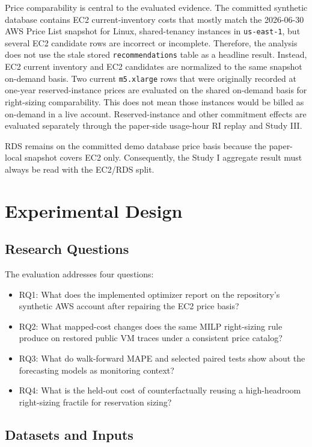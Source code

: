 \documentclass[11pt]{article}
\begin{document}
Price comparability is central to the evaluated evidence. The committed
synthetic database contains EC2 current-inventory costs that mostly match the
2026-06-30 AWS Price List snapshot for Linux, shared-tenancy instances in
\texttt{us-east-1}, but several EC2 candidate rows are incorrect or
incomplete. Therefore, the analysis does not use the stale stored
\texttt{recommendations} table as a headline result. Instead, EC2 current
inventory and EC2 candidates are normalized to the same snapshot on-demand
basis. Two current \texttt{m5.xlarge} rows that were originally recorded at
one-year reserved-instance prices are evaluated on the shared on-demand basis
for right-sizing comparability. This does not mean those instances would be
billed as on-demand in a live account. Reserved-instance and other commitment
effects are evaluated separately through the paper-side usage-hour RI replay
and Study III.

RDS remains on the committed demo database price basis because the paper-local
snapshot covers EC2 only. Consequently, the Study I aggregate result must
always be read with the EC2/RDS split.

\section{Experimental Design}

\subsection{Research Questions}

The evaluation addresses four questions:

\begin{itemize}
\item RQ1: What does the implemented optimizer report on the repository's
synthetic AWS account after repairing the EC2 price basis?
\item RQ2: What mapped-cost changes does the same MILP right-sizing rule
produce on restored public VM traces under a consistent price catalog?
\item RQ3: What do walk-forward MAPE and selected paired tests show about the
forecasting models as monitoring context?
\item RQ4: What is the held-out cost of counterfactually reusing a
high-headroom right-sizing fractile for reservation sizing?
\end{itemize}

\subsection{Datasets and Inputs}
\end{document}
